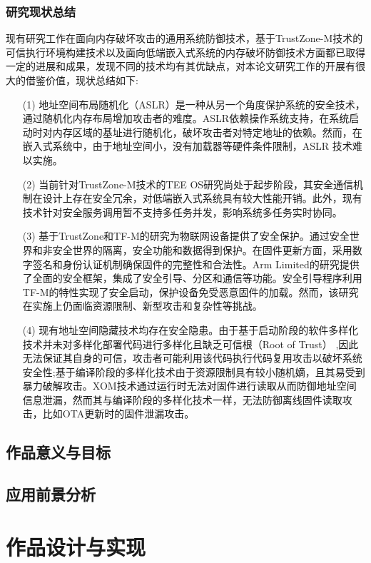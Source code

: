 \documentclass[12pt,a4paper]{ctexart}
\numberwithin{figure}{section}
\begin{document}
\subsubsection{研究现状总结}
\par 现有研究工作在面向内存破坏攻击的通用系统防御技术，基于TrustZone-M技术的可信执行环境构建技术以及面向低端嵌入式系统的内存破坏防御技术方面都已取得一定的进展和成果，发现不同的技术均有其优缺点，对本论文研究工作的开展有很大的借鉴价值，现状总结如下:
\begin{itemize}
    \item[(1)] 地址空间布局随机化（ASLR）是一种从另一个角度保护系统的安全技术，通过随机化内存布局增加攻击者的难度。ASLR依赖操作系统支持，在系统启动时对内存区域的基址进行随机化，破坏攻击者对特定地址的依赖。然而，在嵌入式系统中，由于地址空间小，没有加载器等硬件条件限制，ASLR 技术难以实施。
    \item[(2)] 当前针对TrustZone-M技术的TEE OS研究尚处于起步阶段，其安全通信机制在设计上存在安全冗余，对低端嵌入式系统具有较大性能开销。此外，现有技术针对安全服务调用暂不支持多任务并发，影响系统多任务实时协同。
    \item[(3)] 基于TrustZone和TF-M的研究为物联网设备提供了安全保护。通过安全世界和非安全世界的隔离，安全功能和数据得到保护。在固件更新方面，采用数字签名和身份认证机制确保固件的完整性和合法性。Arm Limited的研究提供了全面的安全框架，集成了安全引导、分区和通信等功能。安全引导程序利用TF-M的特性实现了安全启动，保护设备免受恶意固件的加载。然而，该研究在实施上仍面临资源限制、新型攻击和复杂性等挑战。
    \item[(4)] 现有地址空间隐藏技术均存在安全隐患。由于基于启动阶段的软件多样化技术并未对多样化部署代码进行多样化且缺乏可信根（Root of Trust） ,因此无法保证其自身的可信，攻击者可能利用该代码执行代码复用攻击以破坏系统安全性;基于编译阶段的多样化技术由于资源限制具有较小随机嫡，且其易受到暴力破解攻击。XOM技术通过运行时无法对固件进行读取从而防御地址空间信息泄漏，然而其与编译阶段的多样化技术一样，无法防御离线固件读取攻击，比如OTA更新时的固件泄漏攻击。
\end{itemize}
\subsection{作品意义与目标}

\subsection{应用前景分析}

\section{作品设计与实现}
\end{document}
